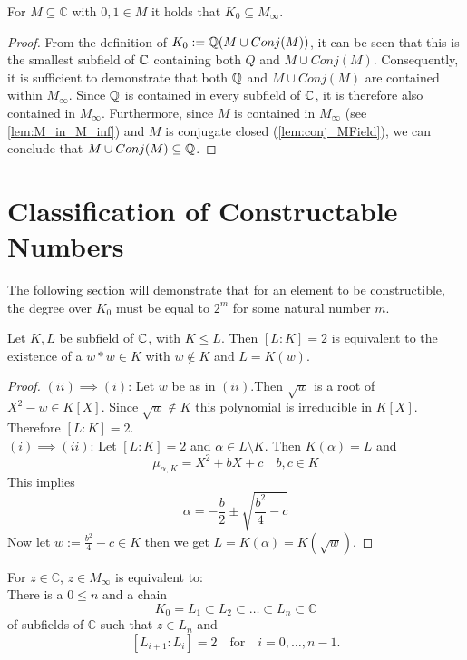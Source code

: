 \begin{lemma}
    \label{lem:K_zero_in_MField}
    \leanok
    For $M\subseteq \mathbb{C}$ with $0,1 \in M$ it holds that $K_0 \subseteq M_{\infty}$.
\end{lemma}
\begin{proof}
From the definition of $K_0 := \mathbb{Q}(M\cup Conj(M))$, 
it can be seen that this is the smallest subfield of $\mathbb{C}$ containing both $Q$ and $M\cup Conj(M)$. 
Consequently, it is sufficient to demonstrate that both $\mathbb{Q}$ and $M\cup Conj(M)$ are contained within $M_{\infty}$. 
Since $\mathbb{Q}$ is contained in every subfield of $\mathbb{C}$, it is therefore also contained in $M_{\infty}$. 
Furthermore, since $M$ is contained in $M_{\infty}$ (see \ref{lem:M_in_M_inf}) and $M$ is conjugate closed (\ref{lem:conj_MField}), we can conclude that $M\cup Conj(M) \subseteq \mathbb{Q}$.
\end{proof}

\section{Classification of Constructable Numbers}
The following section will demonstrate that for an element to be constructible, the degree over $K_0$ must be equal to $2^m$ for some natural number $m$.

\begin{lemma}
    \label{lem:dergree_two_eq_sqr}
    Let $K, L$ be subfield of $\mathbb{C}$, with $K\le L$. Then $[L:K] = 2$ is equivalent to the existence of a $w*w \in K$ with $w \notin K$ and $L = K(w)$.
\end{lemma}
\begin{proof}
    $(ii)\implies (i)$: Let $w$ be as in $(ii)$.Then $\sqrt{w}$ is a root of $X^2 - w \in K[X]$. Since $\sqrt{w} \notin K$ this polynomial is irreducible in $K[X]$. Therefore $[L:K] = 2$.\\
    $(i)\implies (ii)$: Let $[L:K] = 2$ and $\alpha \in L \setminus K$. Then $K(\alpha) = L$ and 
    $$\mu_{\alpha, K}=X^2 + bX + c \quad b,c \in K$$
    This implies 
    $$\alpha = -\frac{b}{2} \pm \sqrt{\frac{b^2}{4} - c} $$
    Now let $w := \frac{b^2}{4} - c \in K$ then we get $L = K(\alpha) = K(\sqrt{w})$.
\end{proof}

\begin{theorem}
    \label{thm:Classfication_z_in_M_inf}
    For $z \in \mathbb{C}$, $z \in M_{\infty}$ is equivalent to:\\
    There is a $0\le n$ and a chain 
    $$K_0 = L_1 \subset L_2 \subset \ldots \subset L_n \subset \mathbb{C}$$
    of subfields of $\mathbb{C}$ such that $z \in L_n$ and 
    $$ [L_{i+1}:L_i] = 2 \quad \text{for} \quad i = 0, \ldots, n-1.$$
\end{theorem}

